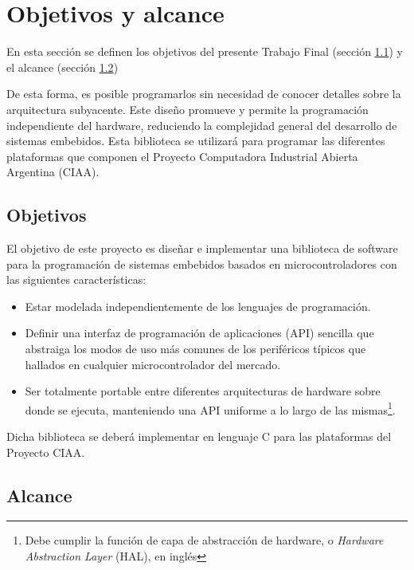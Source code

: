 \section{Objetivos y alcance}
\label{sec:objetivosAlance}

En esta sección se definen los objetivos del presente Trabajo Final (sección \ref{subsec:objetivos}) y el alcance (sección \ref{subsec:alcance}) 

De esta forma, es posible programarlos sin necesidad de conocer detalles sobre
la arquitectura subyacente. Este diseño promueve y permite la programación 
independiente del hardware, reduciendo la complejidad general del desarrollo de
sistemas embebidos. Esta biblioteca se utilizará para programar las diferentes
plataformas que componen el Proyecto Computadora Industrial Abierta Argentina 
(CIAA).

\subsection{Objetivos}
\label{subsec:objetivos}

El objetivo de este proyecto es diseñar e implementar una biblioteca de
software para la programación de sistemas embebidos basados en
microcontroladores con las siguientes características: 

\begin{itemize}
   \item Estar modelada independientemente de los lenguajes de programación.
   \item Definir una interfaz de programación de aplicaciones (API) sencilla que abstraiga los modos de uso más comunes de los periféricos típicos que hallados en cualquier microcontrolador del mercado. 
   \item Ser totalmente portable entre diferentes arquitecturas de hardware sobre donde se ejecuta, manteniendo una API uniforme a lo largo de las mismas\footnote{Debe cumplir la función de capa de abstracción de hardware, o \textit{Hardware Abstraction Layer} (HAL),  en inglés}.
\end{itemize}

Dicha biblioteca se deberá implementar en lenguaje C para las plataformas del
Proyecto CIAA.

\subsection{Alcance}
\label{subsec:alcance}

